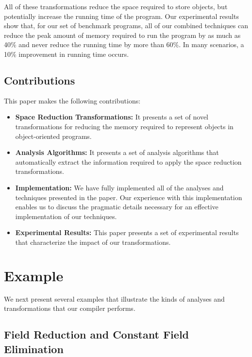 \documentclass{acmconf}
\begin{document}
All of these transformations reduce the space required to store
objects, but potentially increase the running time of the program.
Our experimental results show that, for our set of benchmark
programs, all of our combined techniques can reduce the peak amount of memory
required to run the program by as much as 40\% and never reduce the
running time by more than 60\%.  In many scenarios, a 10\% improvement
in running time occurs.

\subsection{Contributions}

This paper makes the following contributions:
\begin{itemize}
\item {\bf Space Reduction Transformations:} It presents a set
of novel transformations for reducing the memory required to 
represent objects in object-oriented programs.

\item {\bf Analysis Algorithms:} It presents a set of 
analysis algorithms that automatically extract the 
information required to apply the space reduction 
transformations.

\item {\bf Implementation:} We have fully 
implemented all of the analyses and techniques 
presented in the paper. Our experience with this
implementation enables us to discuss the pragmatic
details necessary for an effective implementation 
of our techniques. 

\item {\bf Experimental Results:} This paper presents a set
of experimental results that characterize the impact
of our transformations.
\end{itemize}

\section{Example}

We next present several examples that illustrate the kinds of 
analyses and transformations that our compiler performs.

\subsection{Field Reduction and Constant Field Elimination}
\end{document}
